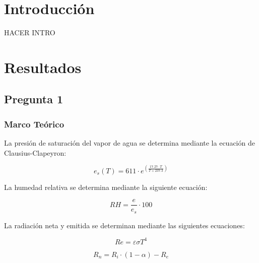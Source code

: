 \documentclass{article}  %
\begin{document}
\newpage
\thispagestyle{empty} %
\tableofcontents
\thispagestyle{plain} %
\thispagestyle{empty} %
\newpage

\setcounter{page}{1}
\section{Introducción}
HACER INTRO
\newpage
\section{Resultados}

\subsection{Pregunta 1}

\subsubsection{Marco Teórico}

La presión de saturación del vapor de agua se determina mediante la ecuación de Clausius-Clapeyron:
  
\begin{equation}
  e_s(T) = 611 \cdot e^{\left(\frac{17.27 \cdot T}{T + 237.3}\right)}
\end{equation}

La humedad relativa se determina mediante la siguiente ecuación:

\begin{equation}
  RH = \frac{e}{e_s} \cdot 100
\end{equation}

La radiación neta y emitida se determinan mediante las siguientes ecuaciones:

\begin{equation}
  Re = \varepsilon \sigma T^4
\end{equation}

\begin{equation}
  R_n = R_i \cdot (1 - \alpha) - R_{e}
\end{equation}
\end{document}
